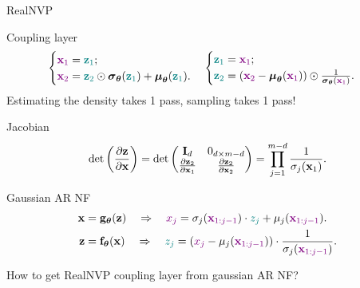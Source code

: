\begin{frame}{RealNVP}
	\begin{block}{Coupling layer}
		\vspace{-0.7cm}
		\[
		 \begin{cases} {\color{violet}\mathbf{x}_1} = {\color{teal}\mathbf{z}_1}; \\ {\color{violet}\mathbf{x}_2} = {\color{teal}\mathbf{z}_2} \odot \boldsymbol{\sigma}_{\boldsymbol{\theta}}({\color{teal}\mathbf{z}_1}) + \boldsymbol{\mu}_{\boldsymbol{\theta}}({\color{teal}\mathbf{z}_1}).\end{cases}  
		\begin{cases} {\color{teal}\mathbf{z}_1} ={\color{violet} \mathbf{x}_1}; \\ {\color{teal}\mathbf{z}_2} = \left({\color{violet}\mathbf{x}_2} - \boldsymbol{\mu}_{\boldsymbol{\theta}}({\color{violet}\mathbf{x}_1}) \right) \odot \frac{1}{\boldsymbol{\sigma}_{\boldsymbol{\theta}}({\color{violet}\mathbf{x}_1})}.\end{cases}
		\]
		Estimating the density takes 1 pass, sampling takes 1 pass!
	\end{block}
	\begin{block}{Jacobian}
		\vspace{-0.5cm}
		\[
		\det \left( \frac{\partial \mathbf{z}}{\partial \mathbf{x}} \right) = \det 
		\begin{pmatrix}
			\mathbf{I}_d & 0_{d \times m - d} \\
			\frac{\partial \mathbf{z}_2}{\partial \mathbf{x}_1} & \frac{\partial \mathbf{z}_2}{\partial \mathbf{x}_2}
		\end{pmatrix} = \prod_{j=1}^{m - d} \frac{1}{\sigma_j(\mathbf{x}_1)}.
		\]
		\vspace{-0.5cm}
	\end{block}
	\begin{block}{Gaussian AR NF}
		\vspace{-0.6cm}
		\begin{align*}
			\mathbf{x} &= \mathbf{g}_{\boldsymbol{\theta}}(\mathbf{z}) \quad \Rightarrow \quad {\color{violet}x_j} = \sigma_j ({\color{violet}\mathbf{x}_{1:j-1}}) \cdot {\color{teal} z_j} + \mu_j({\color{violet}\mathbf{x}_{1:j-1}}). \\
			\mathbf{z} &= \mathbf{f}_{\boldsymbol{\theta}}(\mathbf{x}) \quad \Rightarrow \quad {\color{teal} z_j} = \left({\color{violet} x_j} - \mu_j({\color{violet}\mathbf{x}_{1:j-1}}) \right) \cdot \frac{1}{\sigma_j ({\color{violet} \mathbf{x}_{1:j-1}}) }.
		\end{align*}
		\vspace{-0.5cm}
	\end{block}
	How to get RealNVP coupling layer from gaussian AR NF?
	
\end{frame}
